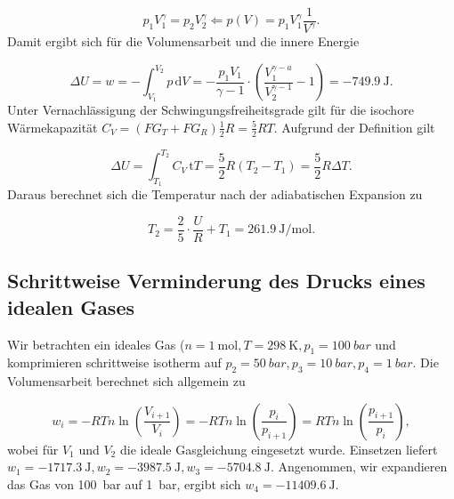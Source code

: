         \begin{equation}
          p_1 V_1^{\gamma} = p_2 V_2^{\gamma} \Leftarrow p(V) = p_1 V_1^{\gamma} \frac{1}{V^{\gamma}}.
        \end{equation}
      Damit ergibt sich für die Volumensarbeit und die innere Energie
      
        \begin{equation}
          \Delta U = w = - \int_{V_1}^{V_2} p \, \text{d} V = - \frac{p_1 V_1}{\gamma - 1} \cdot \left(\frac{V_1^{\gamma - a}}{V_2^{\gamma - 1}} - 1\right) = \SI[mode=text]{-749.9}{\joule}.
        \end{equation}
      Unter Vernachlässigung der Schwingungsfreiheitsgrade gilt für die isochore Wärmekapazität $C_V = (FG_T + FG_R)\frac{1}{2} R = \frac{5}{2} RT$. Aufgrund der Definition gilt
      
        \begin{equation}
          \Delta U = \int_{T_1}^{T_2} C_V \, \text{t} T = \frac{5}{2} R \left(T_2 - T_1\right) =  \frac{5}{2} R \Delta T.
        \end{equation}
        Daraus berechnet sich die Temperatur nach der adiabatischen Expansion zu 
        
          \begin{equation}
            T_2 = \frac{2}{5} \cdot \frac{U}{R} + T_1 = \SI[mode=text]{261.9}{\joule\per\mole}.
          \end{equation}
          
  \subsection{Schrittweise Verminderung des Drucks eines idealen Gases}
  
    Wir betrachten ein ideales Gas ($n = \SI[mode=text]{1}{\mole}, T = \SI[mode=text]{298}{\kelvin}, p_1 = \SI[mode=text]{100}{bar}$ und komprimieren schrittweise isotherm auf $p_2 = \SI[mode=text]{50}{bar}, p_3 = \SI[mode=text]{10}{bar}, p_4 = \SI[mode=text]{1}{bar}$. Die Volumensarbeit berechnet sich allgemein zu
    
      \begin{equation}
        w_i = - RTn \ln\left(\frac{V_{i+1}}{V_i}\right) = - RTn \ln\left(\frac{p_i}{p_{i+1}}\right) = RTn \ln\left(\frac{p_{i+1}}{p_i}\right),
      \end{equation}
      wobei für $V_1$ und $V_2$ die ideale Gasgleichung eingesetzt wurde. Einsetzen liefert $w_1 = \SI[mode=text]{-1717.3}{\joule}, w_2 = \SI[mode=text]{-3987.5}{\joule}, w_3 = \SI[mode=text]{-5704.8}{\joule}$. Angenommen, wir expandieren das Gas von \SI[mode=text]{100}{bar} auf \SI[mode=text]{1}{bar}, ergibt sich $w_4 = \SI[mode=text]{-11409.6}{\joule}$. 
      
